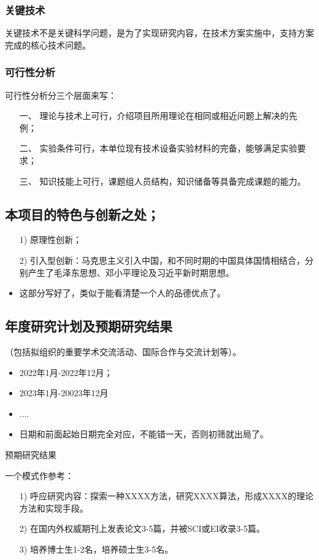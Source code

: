 \subsubsection{关键技术}
关键技术不是关键科学问题，是为了实现研究内容，在技术方案实施中，支持方案完成的核心技术问题。


\subsubsection{可行性分析}
可行性分析分三个层面来写：
\begin{itemize}
\item[一、]理论与技术上可行，介绍项目所用理论在相同或相近问题上解决的先例；
\item[二、]实验条件可行，本单位现有技术设备实验材料的完备，能够满足实验要求；
\item[三、]知识技能上可行，课题组人员结构，知识储备等具备完成课题的能力。
\end{itemize}


\subsection{本项目的特色与创新之处；}
\begin{itemize}
\item[1)] 原理性创新；
\item[2)] 引入型创新：马克思主义引入中国，和不同时期的中国具体国情相结合，分别产生了毛泽东思想、邓小平理论及习近平新时期思想。
\item 这部分写好了，类似于能看清楚一个人的品德优点了。
\end{itemize}



\subsection{年度研究计划及预期研究结果}
（包括拟组织的重要学术交流活动、国际合作与交流计划等）。
\begin{itemize}
\item 2022年1月-2022年12月；
\item 2023年1月-20023年12月
\item ....
\item 日期和前面起始日期完全对应，不能错一天，否则初筛就出局了。
\end{itemize}

预期研究结果

一个模式作参考：
\begin{itemize}
\item[1)] 呼应研究内容：探索一种XXXX方法，研究XXXX算法，形成XXXX的理论方法和实现手段。

\item[2)] 在国内外权威期刊上发表论文3-5篇，并被SCI或EI收录3-5篇。

\item[3)] 培养博士生1-2名，培养硕士生3-5名。
\end{itemize}



